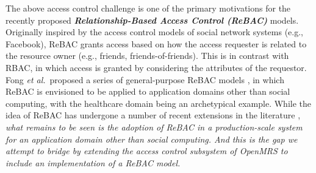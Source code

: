 \documentclass{acm_proc_article-sp}
\newcommand{\Dfn}[1]{\textbf{\emph{#1}}}
\begin{document}
The above access control challenge is one of the primary motivations
for the recently proposed \Dfn{Relationship-Based Access Control
  (ReBAC)} models.  Originally inspired by the access control models
of social network systems (e.g., Facebook), ReBAC grants access based
on how the access requester is related to the resource owner (e.g.,
friends, friends-of-friends).  This is in contrast with RBAC, in which
access is granted by considering the attributes of the requestor.
Fong \emph{et al.}~proposed a series of general-purpose ReBAC models
\cite{Fong:2011,Fong-Siahaan:2011,Bruns-etal:2012}, in which ReBAC is
envisioned to be applied to application domains other than social
computing, with the healthcare domain being an archetypical example.
While the idea of ReBAC has undergone a number of recent extensions in
the literature \cite{Cheng-et-al:2012a, Cheng-et-al:2012b,
  Aktoudianakis-et-al:2013, Crampton-Sellwood:2014, Fong-etal:2013,
  Location}, \emph{what remains to be seen is the adoption of ReBAC in a
production-scale system for an application domain other than social
computing.  And this is the gap we attempt to bridge by extending the
access control subsystem of OpenMRS to include an implementation of a
ReBAC model.}
\end{document}
